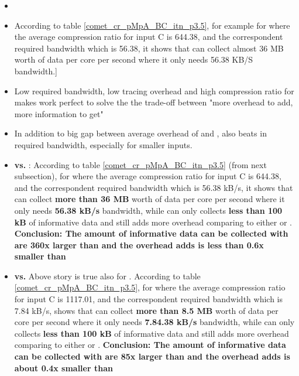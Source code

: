 \begin{itemize}
\item 
\item According to table \ref{comet_cr_pMpA_BC_itn_p3.5}, for example for \parlota where the average compression ratio for input C is 644.38, and the correspondent required bandwidth which is 56.38, it shows that \parlot can collect almost 36 MB worth of data per core per second where it only needs 56.38 KB/S bandwidth.]
\item Low required bandwidth, low tracing overhead and high compression ratio for makes \parlot work perfect to solve the the trade-off between "more overhead to add, more information to get"
\item In addition to big gap between average overhead of \parlotm and \callgrind, \parlotm also beats \callgrind in required bandwidth, especially for smaller inputs.
	\item \textbf{\parlota vs. \callgrind}: According to table \ref{comet_cr_pMpA_BC_itn_p3.5} (from next subsection), for \parlota where the average compression ratio for input C is 644.38, and the correspondent required bandwidth which is 56.38 kB/s, it shows that \parlota can collect \textbf{more than 36 MB} worth of data per core per second where it only needs \textbf{56.38 kB/s} bandwidth, while \callgrind can only collects \textbf{less than 100 kB} of informative data and still adds more overhead comparing to either \parlota or \parlotm. \textbf{Conclusion: The amount of informative data can be collected with \parlota  are 360x larger than \callgrind and the overhead \parlota adds is less than 0.6x smaller than \callgrind}
	\item \textbf{\parlotm vs. \callgrind} Above story is true also for \parlotm. According to table \ref{comet_cr_pMpA_BC_itn_p3.5}, for \parlotm where the average compression ratio for input C is 1117.01, and the correspondent required bandwidth which is 7.84 kB/s, shows that \parlotm can collect \textbf{more than 8.5 MB} worth of data per core per second where it only needs \textbf{7.84.38 kB/s} bandwidth, while \callgrind can only collects \textbf{less than 100 kB} of informative data and still adds more overhead comparing to either \parlota or \parlotm. \textbf{Conclusion: The amount of informative data can be collected with \parlotm  are 85x larger than \callgrind and the overhead \parlotm adds is about 0.4x smaller than \callgrind}
\end{itemize}

